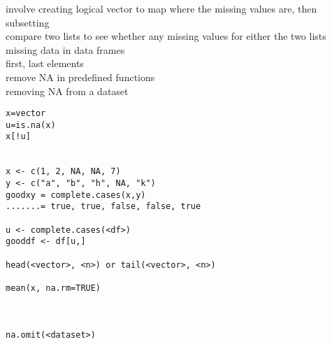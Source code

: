 \documentclass[12pt,a4paper]{report}
\begin{document}
\begin{tcolorbox}[colback=pageyl,colframe=pagebl,title= R \hfill Removing missing NA values,coltitle=Magenta,fonttitle=\bfseries,coltext=Black,width=0.9\paperwidth,boxrule=2mm]\colorbox{pageyl}{\noindent\begin{minipage}[t]{0.3\textwidth}\sffamily \color{ctnb}\vspace{\baselineskip}
involve creating logical vector to map where the missing values are, then subsetting\\[2\baselineskip]
compare two lists to see whether any missing values for either the two lists\\[2\baselineskip]
missing data in data frames\\[2\baselineskip]
first, last elements\\[\baselineskip]
remove NA in predefined functions\\[2\baselineskip]
removing NA from a dataset
\end{minipage}}\qquad\begin{minipage}[t]{0.672\textwidth}
{\begin{lstlisting}[frame=single,framerule=0pt, numbers=none, numbersep=10pt, aboveskip=20pt,belowskip=20pt]
x=vector
u=is.na(x)
x[!u]


x <- c(1, 2, NA, NA, 7)
y <- c("a", "b", "h", NA, "k")
goodxy = complete.cases(x,y)
.......= true, true, false, false, true

u <- complete.cases(<df>)
gooddf <- df[u,]

head(<vector>, <n>) or tail(<vector>, <n>)

mean(x, na.rm=TRUE)



na.omit(<dataset>)
\end{lstlisting}}\end{minipage}\end{tcolorbox}
\end{document}
